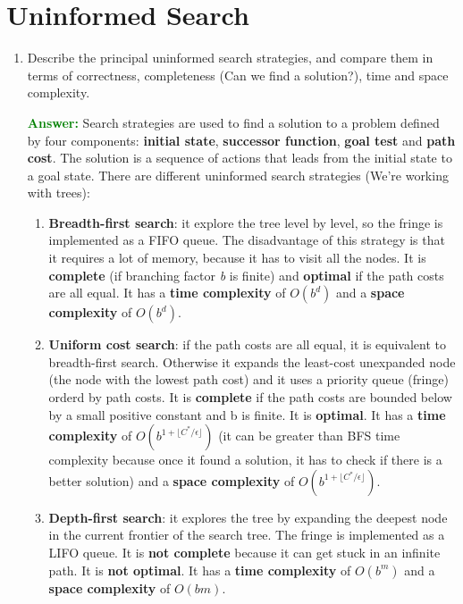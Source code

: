 \documentclass[12pt]{article}
\begin{document}
\section{Uninformed Search}
\begin{enumerate}[label=\textbf{US.\arabic*}]
    \item Describe the principal uninformed search strategies, 
    and compare them in terms of correctness, completeness (Can we find a solution?), time and space complexity.

    \textcolor{green}{\textbf{Answer:}}
    Search strategies are used to find a solution to a problem defined by four components: 
    \textbf{initial state}, \textbf{successor function}, \textbf{goal test} and \textbf{path cost}.
    The solution is a sequence of actions that leads from the initial state to a goal state.
    There are different uninformed search strategies (We're working with trees):
    \begin{enumerate}
        \item \textbf{Breadth-first search}: it explore the tree level by level, 
        so the fringe is implemented as a FIFO queue.
        The disadvantage of this strategy is that it requires a lot of memory, because it has to visit all the nodes.
        It is \textbf{complete} (if branching factor \textit{b} is finite) and \textbf{optimal} if the path costs are all equal.
        It has a \textbf{time complexity} of $O(b^d)$ and a \textbf{space complexity} of $O(b^d)$.
    
        \item \textbf{Uniform cost search}: if the path costs are all equal, it is equivalent to breadth-first search.
        Otherwise it expands the least-cost unexpanded node (the node with the lowest path cost) and it uses a priority queue (fringe) 
        orderd by path costs.
        It is \textbf{complete} if the path costs are bounded below by a small positive constant and b is finite.
        It is \textbf{optimal}.
        It has a \textbf{time complexity} of $O(b^{1+\lfloor C^*/\epsilon \rfloor})$ (it can be greater than BFS time complexity because once it found a solution, it has to check if there is a better solution)
        and a \textbf{space complexity} of $O(b^{1+\lfloor C^*/\epsilon \rfloor})$.
    
        \item \textbf{Depth-first search}: it explores the tree by expanding the deepest node in the current frontier of the search tree.
        The fringe is implemented as a LIFO queue.
        It is \textbf{not complete} because it can get stuck in an infinite path.
        It is \textbf{not optimal}.
        It has a \textbf{time complexity} of $O(b^m)$ and a \textbf{space complexity} of $O(bm)$.


\end{enumerate}
\end{enumerate}
\end{document}
